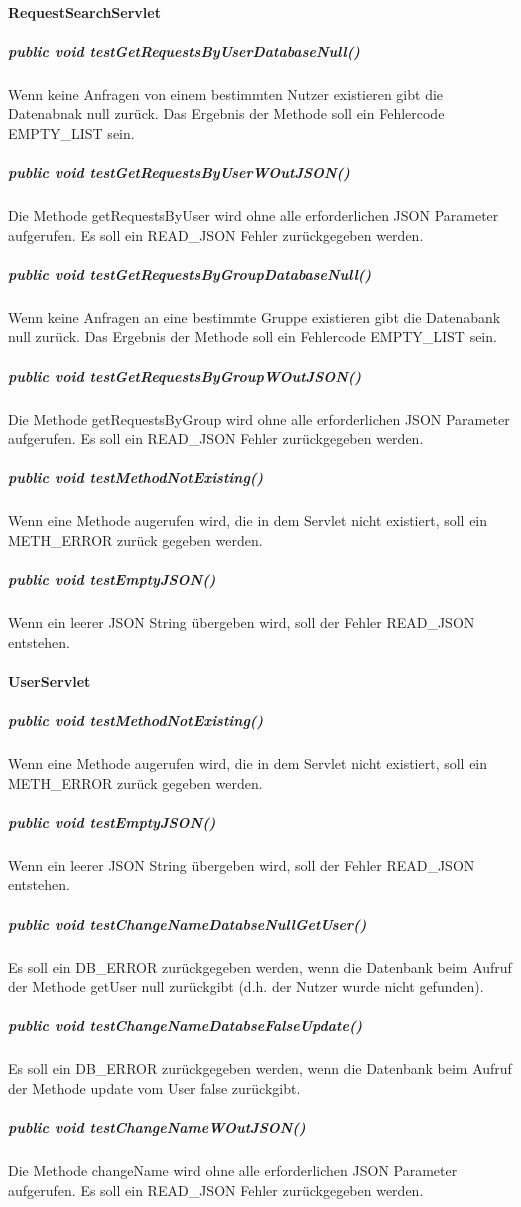 \documentclass{scrartcl}
\begin{document}
\paragraph{RequestSearchServlet}
\subparagraph{public void testGetRequestsByUserDatabaseNull()}
Wenn keine Anfragen von einem bestimmten Nutzer existieren gibt die Datenabnak null zurück. Das Ergebnis der Methode soll ein Fehlercode EMPTY\_LIST sein.
\subparagraph{public void testGetRequestsByUserWOutJSON()}
Die Methode getRequestsByUser wird ohne alle erforderlichen JSON Parameter aufgerufen. Es soll ein READ\_JSON Fehler zurückgegeben werden.
\subparagraph{public void testGetRequestsByGroupDatabaseNull()}
Wenn keine Anfragen an eine bestimmte Gruppe existieren gibt die Datenabank null zurück. Das Ergebnis der Methode soll ein Fehlercode EMPTY\_LIST sein.
\subparagraph{public void testGetRequestsByGroupWOutJSON()}
Die Methode getRequestsByGroup wird ohne alle erforderlichen JSON Parameter aufgerufen. Es soll ein READ\_JSON Fehler zurückgegeben werden.
\subparagraph{public void testMethodNotExisting()}
Wenn eine Methode augerufen wird, die in dem Servlet nicht existiert, soll ein METH\_ERROR zurück gegeben werden.
\subparagraph{public void testEmptyJSON()}
Wenn ein leerer JSON String übergeben wird, soll der Fehler READ\_JSON entstehen.

\paragraph{UserServlet}
\subparagraph{public void testMethodNotExisting()} 
Wenn eine Methode augerufen wird, die in dem Servlet nicht existiert, soll ein METH\_ERROR zurück gegeben werden.
\subparagraph{public void testEmptyJSON()}
Wenn ein leerer JSON String übergeben wird, soll der Fehler READ\_JSON entstehen.
\subparagraph{public void testChangeNameDatabseNullGetUser()}
Es soll ein DB\_ERROR zurückgegeben werden, wenn die Datenbank beim Aufruf der Methode getUser null zurückgibt (d.h. der Nutzer wurde nicht gefunden).
\subparagraph{public void testChangeNameDatabseFalseUpdate()}
Es soll ein DB\_ERROR zurückgegeben werden, wenn die Datenbank beim Aufruf der Methode update vom User false zurückgibt.
\subparagraph{public void testChangeNameWOutJSON()}
Die Methode changeName wird ohne alle erforderlichen JSON Parameter aufgerufen. Es soll ein READ\_JSON Fehler zurückgegeben werden.
\end{document}
